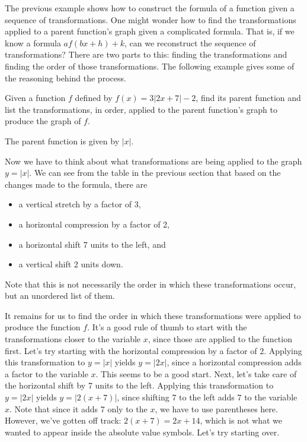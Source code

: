 \documentclass[handout, noauthor, nooutcomes]{ximera}
\begin{document}
The previous example shows how to construct the formula of a function given a sequence of transformations. One might wonder how to find the transformations applied to a parent function's graph given a complicated formula. That is, if we know a formula $af(bx + h) + k$, can we reconstruct the sequence of transformations? There are two parts to this: finding the transformations and finding the order of those transformations. The following example gives some of the reasoning behind the process. 

\begin{example}
Given a function $f$ defined by $f(x) = 3|2x + 7| - 2$, find its parent function and list the transformations, in order, applied to the parent function's graph to produce the graph of $f$. 
\begin{explanation}
The parent function is given by $|x|$. 

Now we have to think about what transformations are being applied to the graph $y = |x|$. We can see from the table in the previous section that based on the changes made to the formula, there are 
\begin{itemize}
\item a vertical stretch by a factor of 3,
\item a horizontal compression by a factor of 2,
\item a horizontal shift 7 units to the left, and
\item a vertical shift 2 units down.
\end{itemize}
Note that this is not necessarily the order in which these transformations occur, but an unordered list of them. 

It remains for us to find the order in which these transformations were applied to produce the function $f$. It's a good rule of thumb to start with the transformations closer to the variable $x$, since those are applied to the function first. Let's try starting with the horizontal compression by a factor of 2. Applying this transformation to $y = |x|$ yields $y = |2x|$, since a horizontal compression adds a factor to the variable $x$. This seems to be a good start. Next, let's take care of the horizontal shift by 7 units to the left. Applying this transformation to $y = |2x|$ yields $y = |2(x + 7)|$, since shifting 7 to the left adds 7 to the variable $x$. Note that since it adds 7 only to the $x$, we have to use parentheses here. However, we've gotten off track: $2(x + 7) = 2x + 14$, which is not what we wanted to appear inside the absolute value symbols. Let's try starting over.


\end{explanation}
\end{example}
\end{document}

